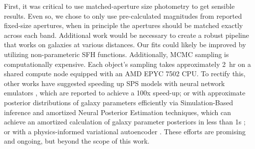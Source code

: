 \documentclass[twocolumn]{aastex63}
\begin{document}
First, it was critical to use matched-aperture size photometry to get sensible results. Even so, we chose to only use pre-calculated magnitudes from reported fixed-size apertures, when in principle the apertures should be matched exactly across each band. Additional work would be necessary to create a robust pipeline that works on galaxies at various distances. Our fits could likely be improved by utilizing non-parameteric SFH functions. Additionally, MCMC sampling is computationally expensive. Each object's sampling takes approximately 2~hr on a shared compute node equipped with an AMD EPYC 7502 CPU. To rectify this, other works have suggested speeding up SPS models with neural network emulators \citep{Kwon_2023_PROVemulator}, which are reported to achieve a 100x speed-up; or with approximate posterior distributions of galaxy parameters efficiently via Simulation-Based inference \citep[SBI;][]{Cranmer2020} and amortized Neural Posterior Estimation \citep[NPE;][]{Papamakarios2016} techniques, which can achieve an amortized calculation of galaxy parameter posteriors in less than 1s \citep[see][and references therein]{Hahn2022, Khullar2022, Wang2023}; or with a physics-informed variational autoencoder \citep{Gagliano2023rapidgalinf}. These efforts are promising and ongoing, but beyond the scope of this work. \par
\end{document}
